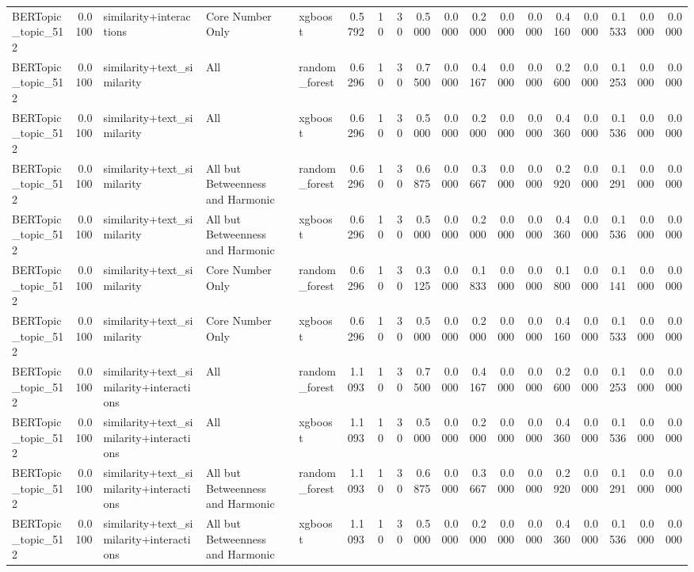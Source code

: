 \begin{tabular}{lrlllrrrrrrrrrrrrr}
BERTopic_topic_512 & 0.0100 & similarity+interactions & Core Number Only & xgboost & 0.5792 & 10 & 30 & 0.5000 & 0.0000 & 0.2000 & 0.0000 & 0.0000 & 0.4160 & 0.0000 & 0.1533 & 0.0000 & 0.0000 \\
BERTopic_topic_512 & 0.0100 & similarity+text_similarity & All & random_forest & 0.6296 & 10 & 30 & 0.7500 & 0.0000 & 0.4167 & 0.0000 & 0.0000 & 0.2600 & 0.0000 & 0.1253 & 0.0000 & 0.0000 \\
BERTopic_topic_512 & 0.0100 & similarity+text_similarity & All & xgboost & 0.6296 & 10 & 30 & 0.5000 & 0.0000 & 0.2000 & 0.0000 & 0.0000 & 0.4360 & 0.0000 & 0.1536 & 0.0000 & 0.0000 \\
BERTopic_topic_512 & 0.0100 & similarity+text_similarity & All but Betweenness and Harmonic & random_forest & 0.6296 & 10 & 30 & 0.6875 & 0.0000 & 0.3667 & 0.0000 & 0.0000 & 0.2920 & 0.0000 & 0.1291 & 0.0000 & 0.0000 \\
BERTopic_topic_512 & 0.0100 & similarity+text_similarity & All but Betweenness and Harmonic & xgboost & 0.6296 & 10 & 30 & 0.5000 & 0.0000 & 0.2000 & 0.0000 & 0.0000 & 0.4360 & 0.0000 & 0.1536 & 0.0000 & 0.0000 \\
BERTopic_topic_512 & 0.0100 & similarity+text_similarity & Core Number Only & random_forest & 0.6296 & 10 & 30 & 0.3125 & 0.0000 & 0.1833 & 0.0000 & 0.0000 & 0.1800 & 0.0000 & 0.1141 & 0.0000 & 0.0000 \\
BERTopic_topic_512 & 0.0100 & similarity+text_similarity & Core Number Only & xgboost & 0.6296 & 10 & 30 & 0.5000 & 0.0000 & 0.2000 & 0.0000 & 0.0000 & 0.4160 & 0.0000 & 0.1533 & 0.0000 & 0.0000 \\
BERTopic_topic_512 & 0.0100 & similarity+text_similarity+interactions & All & random_forest & 1.1093 & 10 & 30 & 0.7500 & 0.0000 & 0.4167 & 0.0000 & 0.0000 & 0.2600 & 0.0000 & 0.1253 & 0.0000 & 0.0000 \\
BERTopic_topic_512 & 0.0100 & similarity+text_similarity+interactions & All & xgboost & 1.1093 & 10 & 30 & 0.5000 & 0.0000 & 0.2000 & 0.0000 & 0.0000 & 0.4360 & 0.0000 & 0.1536 & 0.0000 & 0.0000 \\
BERTopic_topic_512 & 0.0100 & similarity+text_similarity+interactions & All but Betweenness and Harmonic & random_forest & 1.1093 & 10 & 30 & 0.6875 & 0.0000 & 0.3667 & 0.0000 & 0.0000 & 0.2920 & 0.0000 & 0.1291 & 0.0000 & 0.0000 \\
BERTopic_topic_512 & 0.0100 & similarity+text_similarity+interactions & All but Betweenness and Harmonic & xgboost & 1.1093 & 10 & 30 & 0.5000 & 0.0000 & 0.2000 & 0.0000 & 0.0000 & 0.4360 & 0.0000 & 0.1536 & 0.0000 & 0.0000 \\

\end{tabular}
